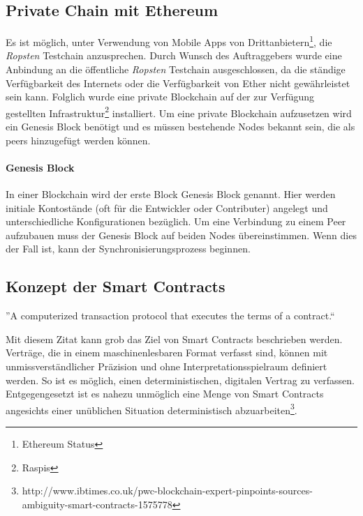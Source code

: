\subsection{Private Chain mit Ethereum}
Es ist möglich, unter Verwendung von Mobile Apps von Drittanbietern\footnote{Ethereum Status}, die \emph{Ropsten} Testchain anzusprechen. Durch Wunsch des Auftraggebers wurde eine Anbindung an die öffentliche \emph{Ropsten} Testchain ausgeschlossen, da die ständige Verfügbarkeit des Internets oder die Verfügbarkeit von Ether nicht gewährleistet sein kann. Folglich wurde eine private Blockchain auf der zur Verfügung gestellten Infrastruktur\footnote{Raspis} installiert. Um eine private Blockchain aufzusetzen wird ein Genesis Block benötigt und es müssen bestehende Nodes bekannt sein, die als peers hinzugefügt werden können.

\paragraph{Genesis Block}
In einer Blockchain wird der erste Block Genesis Block genannt. Hier werden initiale Kontostände (oft für die Entwickler oder Contributer) angelegt und unterschiedliche Konfigurationen bezüglich.
Um eine Verbindung zu einem Peer aufzubauen muss der Genesis Block auf beiden Nodes übereinstimmen. Wenn dies der Fall ist, kann der Synchronisierungsprozess beginnen.

\subsection{Konzept der Smart Contracts}
\label{subsec:Smart_Contracts}
''A computerized transaction protocol that executes the terms of a contract.``\cite{BlockchainRevolution}

Mit diesem Zitat kann grob das Ziel von Smart Contracts beschrieben werden. Verträge, die in einem maschinenlesbaren Format verfasst sind, können mit unmissverständlicher Präzision und ohne Interpretationsspielraum definiert werden. So ist es möglich, einen deterministischen, digitalen Vertrag zu verfassen.
Entgegengesetzt ist es nahezu unmöglich eine Menge von Smart Contracts angesichts einer unüblichen Situation deterministisch abzuarbeiten\footnote{http://www.ibtimes.co.uk/pwc-blockchain-expert-pinpoints-sources-ambiguity-smart-contracts-1575778}.

